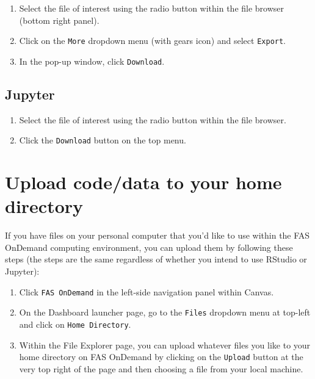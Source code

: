 \documentclass[]{book}
\providecommand{\tightlist}{%
  \setlength{\itemsep}{0pt}\setlength{\parskip}{0pt}}
\begin{document}
\begin{enumerate}
\def\labelenumi{\arabic{enumi}.}
\tightlist
\item
  Select the file of interest using the radio button within the file browser (bottom right panel).
\item
  Click on the \texttt{More} dropdown menu (with gears icon) and select \texttt{Export}.
\item
  In the pop-up window, click \texttt{Download}.
\end{enumerate}

\hypertarget{jupyter-3}{%
\section{Jupyter}\label{jupyter-3}}

\begin{enumerate}
\def\labelenumi{\arabic{enumi}.}
\tightlist
\item
  Select the file of interest using the radio button within the file browser.
\item
  Click the \texttt{Download} button on the top menu.
\end{enumerate}

\hypertarget{upload-codedata-to-your-home-directory}{%
\chapter{Upload code/data to your home directory}\label{upload-codedata-to-your-home-directory}}

If you have files on your personal computer that you'd like to use within the FAS OnDemand computing environment, you can upload them by following these steps (the steps are the same regardless of whether you intend to use RStudio or Jupyter):

\begin{enumerate}
\def\labelenumi{\arabic{enumi}.}
\tightlist
\item
  Click \texttt{FAS\ OnDemand} in the left-side navigation panel within Canvas.
\item
  On the Dashboard launcher page, go to the \texttt{Files} dropdown menu at top-left and click on \texttt{Home\ Directory}.
\item
  Within the File Explorer page, you can upload whatever files you like to your home directory on FAS OnDemand by clicking on the \texttt{Upload} button at the very top right of the page and then choosing a file from your local machine.
\end{enumerate}
\end{document}
